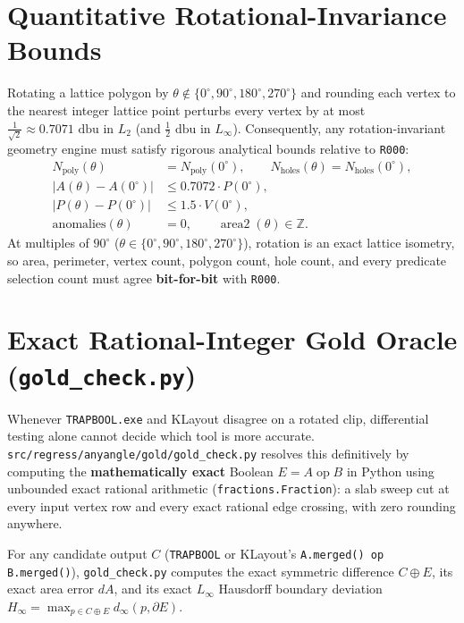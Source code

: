 \section{Quantitative Rotational-Invariance Bounds}

Rotating a lattice polygon by $\theta \notin \{0^\circ, 90^\circ, 180^\circ, 270^\circ\}$ and rounding each vertex to the nearest integer lattice point perturbs every vertex by at most $\tfrac{1}{\sqrt{2}} \approx 0.7071\text{ dbu}$ in $L_2$ (and $\tfrac{1}{2}\text{ dbu}$ in $L_\infty$). Consequently, any rotation-invariant geometry engine must satisfy rigorous analytical bounds relative to \texttt{R000}:
\begin{align}
  N_{\text{poly}}(\theta) &= N_{\text{poly}}(0^\circ), \qquad N_{\text{holes}}(\theta) = N_{\text{holes}}(0^\circ), \\
  \bigl|A(\theta) - A(0^\circ)\bigr| &\le 0.7072 \cdot P(0^\circ), \\
  \bigl|P(\theta) - P(0^\circ)\bigr| &\le 1.5 \cdot V(0^\circ), \\
  \text{anomalies}(\theta) &= 0, \qquad \operatorname{area2}(\theta) \in \mathbb{Z}.
\end{align}
At multiples of $90^\circ$ ($\theta \in \{0^\circ, 90^\circ, 180^\circ, 270^\circ\}$), rotation is an exact lattice isometry, so area, perimeter, vertex count, polygon count, hole count, and every predicate selection count must agree \textbf{bit-for-bit} with \texttt{R000}.

\section{Exact Rational-Integer Gold Oracle (\texttt{gold\_check.py})}

Whenever \texttt{TRAPBOOL.exe} and KLayout disagree on a rotated clip, differential testing alone cannot decide which tool is more accurate. \texttt{src/regress/anyangle/gold/gold\_check.py} resolves this definitively by computing the \textbf{mathematically exact} Boolean $E = A \operatorname{op} B$ in Python using unbounded exact rational arithmetic (\texttt{fractions.Fraction}): a slab sweep cut at every input vertex row and every exact rational edge crossing, with zero rounding anywhere.

For any candidate output $C$ (\texttt{TRAPBOOL} or KLayout's \texttt{A.merged() op B.merged()}), \texttt{gold\_check.py} computes the exact symmetric difference $C \oplus E$, its exact area error $dA$, and its exact $L_\infty$ Hausdorff boundary deviation $H_\infty = \max_{p \in C \oplus E} d_\infty(p, \partial E)$.

